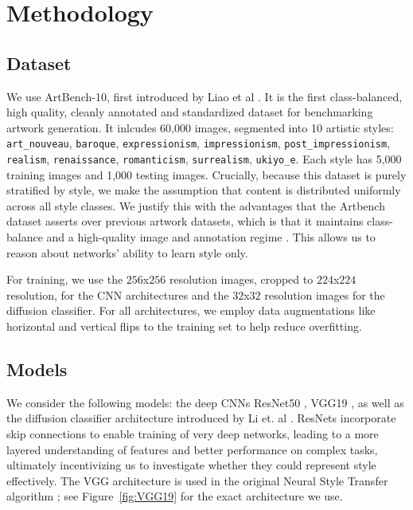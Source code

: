 \documentclass[twocolumn]{article}
\begin{document}
\section{Methodology}

\subsection{Dataset}
We use ArtBench-10, first introduced by Liao et al \cite{liaoArtBenchDatasetBenchmarking2022a}. It is the first class-balanced, high quality, cleanly annotated and standardized dataset for benchmarking artwork generation. It inlcudes 60,000 images, segmented into 10 artistic styles: \verb|art_nouveau|, \verb|baroque|, \verb|expressionism|, \verb|impressionism|, \verb|post_impressionism|, \verb|realism|, \verb|renaissance|, \verb|romanticism|, \verb|surrealism|, \verb|ukiyo_e|. Each style has 5,000 training images and 1,000 testing images. Crucially, because this dataset is purely stratified by style, we make the assumption that content is distributed uniformly across all style classes. We justify this with the advantages that the Artbench dataset asserts over previous artwork datasets, which is that it maintains class-balance and a high-quality image and annotation regime \cite{liaoArtBenchDatasetBenchmarking2022a}. This allows us to reason about networks' ability to learn style only. 

For training, we use the $256$x$256$ resolution images, cropped to $224$x$224$ resolution, for the CNN architectures and the $32$x$32$ resolution images for the diffusion classifier. For all architectures, we employ data augmentations like horizontal and vertical flips to the training set to help reduce overfitting.


\subsection{Models}
We consider the following models: the deep CNNs ResNet50 \cite{heDeepResidualLearning2015}, VGG19 \cite{simonyanVeryDeepConvolutional2014}, as well as the diffusion classifier architecture introduced by Li et. al \cite{liYourDiffusionModel}. ResNets incorporate skip connections to enable training of very deep networks, leading to a more layered understanding of features and better performance on complex tasks, ultimately incentivizing us to investigate whether they could represent style effectively. The VGG architecture is used in the original Neural Style Transfer algorithm \cite{gatysNeuralAlgorithmArtistic2015}; see Figure~\ref{fig:VGG19} for the exact architecture we use. 
\end{document}
